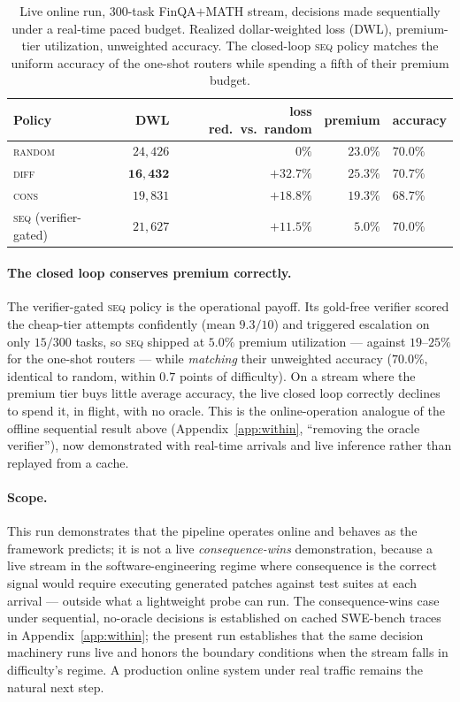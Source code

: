 \documentclass{article}
\begin{document}
\begin{table}[t]
\centering
\caption{Live online run, $300$-task FinQA$+$MATH stream, decisions
made sequentially under a real-time paced budget. Realized
dollar-weighted loss (DWL), premium-tier utilization, unweighted
accuracy. The closed-loop \textsc{seq} policy matches the uniform
accuracy of the one-shot routers while spending a fifth of their
premium budget.}
\label{tab:online}
\small
\begin{tabular}{lrrrl}
\toprule
Policy & DWL & loss red.\ vs.\ random & premium & accuracy \\
\midrule
\textsc{random}      & $24{,}426$ & $0\%$      & $23.0\%$ & $70.0\%$ \\
\textsc{diff}        & $\mathbf{16{,}432}$ & $\mathbf{+32.7\%}$ & $25.3\%$ & $70.7\%$ \\
\textsc{cons}        & $19{,}831$ & $+18.8\%$ & $19.3\%$ & $68.7\%$ \\
\textsc{seq} (verifier-gated) & $21{,}627$ & $+11.5\%$ & $\mathbf{5.0\%}$ & $70.0\%$ \\
\bottomrule
\end{tabular}
\end{table}

\paragraph{The closed loop conserves premium correctly.} The
verifier-gated \textsc{seq} policy is the operational payoff. Its
gold-free verifier scored the cheap-tier attempts confidently
(mean $9.3/10$) and triggered escalation on only $15/300$ tasks, so
\textsc{seq} shipped at $5.0\%$ premium utilization --- against
$19$--$25\%$ for the one-shot routers --- while \emph{matching}
their unweighted accuracy ($70.0\%$, identical to random,
within $0.7$ points of difficulty). On a stream where the premium
tier buys little average accuracy, the live closed loop correctly
declines to spend it, in flight, with no oracle. This is the
online-operation analogue of the offline sequential result above
(Appendix~\ref{app:within}, ``removing the oracle verifier''), now
demonstrated with real-time arrivals and live inference rather than
replayed from a cache.

\paragraph{Scope.} This run demonstrates that the pipeline operates
online and behaves as the framework predicts; it is not a live
\emph{consequence-wins} demonstration, because a live stream in the
software-engineering regime where consequence is the correct signal
would require executing generated patches against test suites at
each arrival --- outside what a lightweight probe can run. The
consequence-wins case under sequential, no-oracle decisions is
established on cached SWE-bench traces in
Appendix~\ref{app:within}; the present run establishes that the same
decision machinery runs live and honors the boundary conditions when
the stream falls in difficulty's regime. A production online system
under real traffic remains the natural next step.
\end{document}
